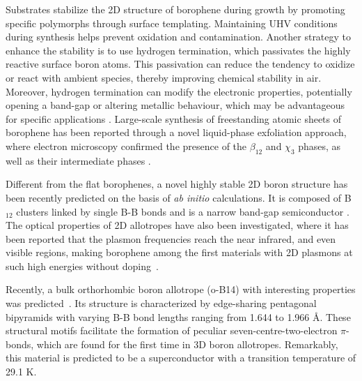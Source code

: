 \documentclass[aps,prb,preprint,notitlepage]{revtex4-2}
\begin{document}
Substrates stabilize the 2D structure of borophene during growth by promoting specific polymorphs through surface templating. Maintaining 
UHV conditions during synthesis helps prevent oxidation and contamination.
Another strategy to enhance the stability is to use hydrogen termination,   which passivates the highly reactive surface boron atoms. 
This passivation can reduce the tendency to oxidize or react with 
ambient species, thereby improving chemical stability in air. Moreover, hydrogen termination can modify the electronic properties, potentially opening a band-gap or altering metallic behaviour, which may be advantageous for specific 
applications \cite{hou2020ultrastable,li2021synthesis}. Large-scale 
synthesis of freestanding atomic sheets of borophene has been reported through a 
novel liquid-phase exfoliation approach, where electron microscopy 
confirmed the presence of the $\beta_{12}$ and $\chi_{3}$ phases, as well
as their intermediate phases \cite{ranjan2019freestanding}.

 Different from the flat borophenes, a novel highly stable 2D boron structure has been recently predicted on the basis of {\em ab initio} calculations. It is
 composed of  B$_{12}$ clusters 
linked by single B-B bonds and is a 
narrow band-gap semiconductor \cite{zhang2023novel}.
The optical properties of 2D allotropes have also been investigated, where
it has been reported that the plasmon frequencies reach the near infrared,
and even visible regions, making borophene among the first materials with 2D plasmons
at such high energies without
doping~\cite{huang2017two}.

Recently, a bulk orthorhombic boron allotrope (o-B14) with
interesting 
properties was predicted~\cite{han2023superconducting}. 
Its structure is characterized 
by edge-sharing pentagonal bipyramids with varying B-B bond lengths
	ranging from 1.644 to 1.966 Å. 
These structural
motifs facilitate the formation of peculiar seven-centre-two-electron 
$\pi$-bonds,  which are found for the first time in 3D 
boron allotropes. 
Remarkably, this material is
predicted to be a superconductor with a transition temperature of 29.1 K.
\end{document}
